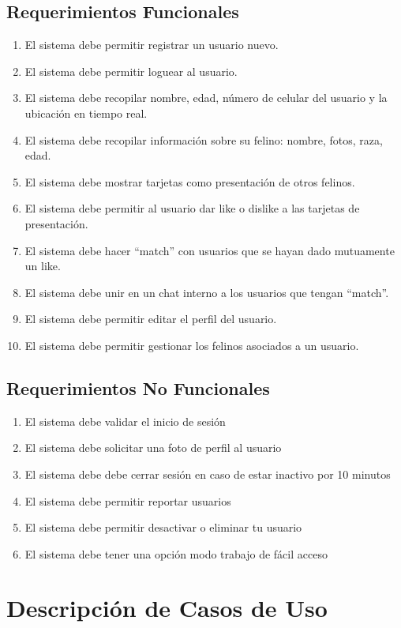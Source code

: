 \documentclass{article}
\begin{document}
\subsection{Requerimientos Funcionales}
\begin{enumerate}
    \item El sistema debe permitir registrar un usuario nuevo.
    \item El sistema debe permitir loguear al usuario.
    \item El sistema debe recopilar nombre, edad, número de celular del usuario y la ubicación en tiempo real.
    \item El sistema debe recopilar información sobre su felino: nombre, fotos, raza, edad.
    \item El sistema debe mostrar tarjetas como presentación de otros felinos.
    \item El sistema debe permitir al usuario dar like o dislike a las tarjetas de presentación.
    \item El sistema debe hacer “match” con usuarios que se hayan dado mutuamente un like.
    \item El sistema debe unir en un chat interno a los usuarios que tengan “match”.
    \item El sistema debe permitir editar el perfil del usuario.
    \item El sistema debe permitir gestionar los felinos asociados a un usuario.
\end{enumerate}
\subsection{Requerimientos No Funcionales}
\begin{enumerate}
    \item El sistema debe validar el inicio de sesión
    \item El sistema debe solicitar una foto de perfil al usuario
    \item El sistema debe debe cerrar sesión en caso de estar inactivo por 10 minutos
    \item El sistema debe permitir reportar usuarios
    \item El sistema debe permitir desactivar o eliminar tu usuario
    \item El sistema debe tener una opción modo trabajo de fácil acceso
\end{enumerate}
\clearpage
\section{Descripción de Casos de Uso}
\end{document}
